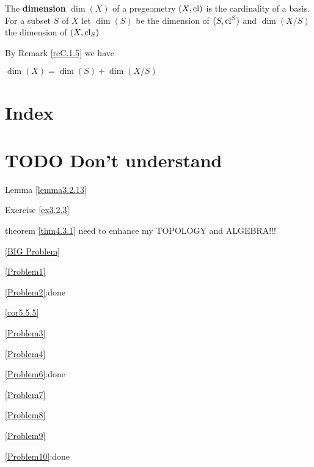 \documentclass[11pt]{article}
\begin{document}
\begin{definition}[]
The \textbf{dimension} \(\dim(X)\) of a pregeometry \((X,\operatorname{\text{cl}})\) is the cardinality of a basis. For a
subset \(S\) of \(X\) let \(\dim(S)\) be the dimension of \((S,\operatorname{\text{cl}}^S)\) and \(\dim(X/S)\) the
dimension of \((X,\operatorname{\text{cl}}_S)\)
\end{definition}

By Remark \ref{reC.1.5} we have
\begin{lemma}[]
\label{lemmaC.1.8}
\(\dim(X)=\dim(S)+\dim(X/S)\)
\end{lemma}
\section{Index}
\label{sec:org05dc0e2}
\renewcommand{\indexname}{}
\printindex
\section{{\bfseries\sffamily TODO} Don't understand}
\label{sec:org3471754}
Lemma \ref{lemma3.2.13}

Exercise \ref{ex3.2.3}

theorem \ref{thm4.3.1} need to enhance my TOPOLOGY and ALGEBRA!!!

\ref{BIG Problem}

\ref{Problem1}

\ref{Problem2}:done

\ref{cor5.5.5}

\ref{Problem3}

\ref{Problem4}



\ref{Problem6}:done

\ref{Problem7}

\ref{Problem8}

\ref{Problem9}

\ref{Problem10}:done
\end{document}
